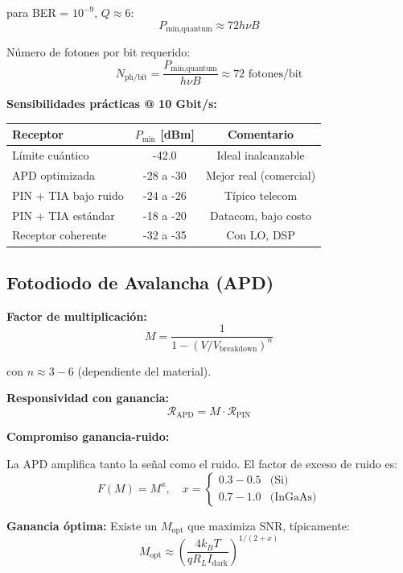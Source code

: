 \documentclass[11pt,a4paper]{article}
\begin{document}
para BER = $10^{-9}$, $Q \approx 6$:
\begin{equation}
    P_{\text{min,quantum}} \approx 72 h\nu B
\end{equation}

Número de fotones por bit requerido:
\begin{equation}
    N_{\text{ph/bit}} = \frac{P_{\text{min,quantum}}}{h\nu B} \approx 72 \text{ fotones/bit}
\end{equation}

\textbf{Sensibilidades prácticas @ 10 Gbit/s:}

\begin{table}[h]
\centering
\begin{tabular}{lcc}
\hline
\textbf{Receptor} & \textbf{$P_{\text{min}}$ [dBm]} & \textbf{Comentario} \\
\hline
Límite cuántico & -42.0 & Ideal inalcanzable \\
APD optimizada & -28 a -30 & Mejor real (comercial) \\
PIN + TIA bajo ruido & -24 a -26 & Típico telecom \\
PIN + TIA estándar & -18 a -20 & Datacom, bajo costo \\
Receptor coherente & -32 a -35 & Con LO, DSP \\
\hline
\end{tabular}
\end{table}

\subsection{Fotodiodo de Avalancha (APD)}

\textbf{Factor de multiplicación:}
\begin{equation}
    M = \frac{1}{1 - (V/V_{\text{breakdown}})^n}
\end{equation}

con $n \approx 3-6$ (dependiente del material).

\textbf{Responsividad con ganancia:}
\begin{equation}
    \mathcal{R}_{\text{APD}} = M \cdot \mathcal{R}_{\text{PIN}}
\end{equation}

\begin{importante}
\textbf{Compromiso ganancia-ruido:}

La APD amplifica tanto la señal como el ruido. El factor de exceso de ruido es:
\begin{equation}
    F(M) = M^x, \quad x = \begin{cases}
    0.3-0.5 & \text{(Si)} \\
    0.7-1.0 & \text{(InGaAs)}
    \end{cases}
\end{equation}

\textbf{Ganancia óptima:} Existe un $M_{\text{opt}}$ que maximiza SNR, típicamente:
\begin{equation}
    M_{\text{opt}} \approx \left(\frac{4k_BT}{qR_LI_{\text{dark}}}\right)^{1/(2+x)}
\end{equation}
\end{importante}
\end{document}
